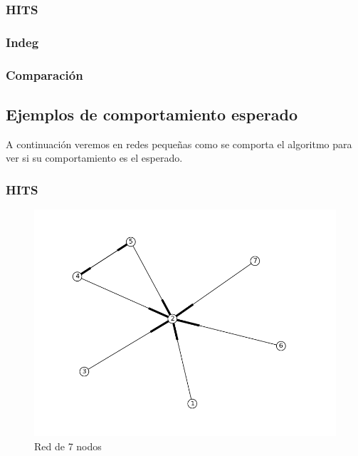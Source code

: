 \subsubsection{HITS}
\subsubsection{Indeg}

\subsubsection{Comparación}






\subsection{Ejemplos de comportamiento esperado}

A continuación veremos en redes pequeñas como se comporta el algoritmo para ver si su comportamiento es el esperado.

\subsubsection{HITS}
 \begin{figure}[!htb]
\begin{center}
    \includegraphics[scale=0.5]{imagenes/test4.png}
    \caption{Red de 7 nodos}
    \end{center}
\end{figure}

